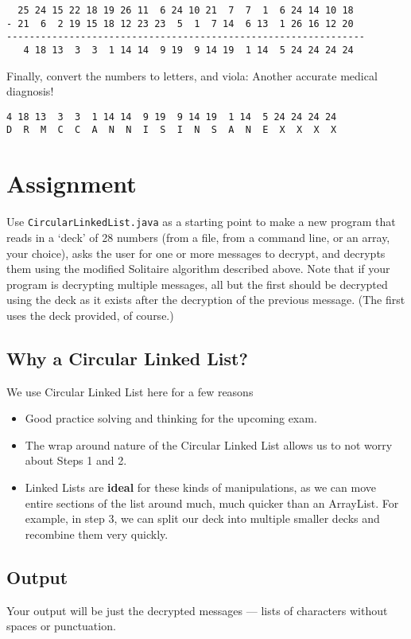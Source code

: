\documentclass[]{article}
\begin{document}
\begin{verbatim}
  25 24 15 22 18 19 26 11  6 24 10 21  7  7  1  6 24 14 10 18
- 21  6  2 19 15 18 12 23 23  5  1  7 14  6 13  1 26 16 12 20
---------------------------------------------------------------
   4 18 13  3  3  1 14 14  9 19  9 14 19  1 14  5 24 24 24 24
\end{verbatim}

Finally, convert the numbers to letters, and viola:  Another
accurate medical diagnosis!

\begin{verbatim}
4 18 13  3  3  1 14 14  9 19  9 14 19  1 14  5 24 24 24 24
D  R  M  C  C  A  N  N  I  S  I  N  S  A  N  E  X  X  X  X
\end{verbatim}


\newpage
\section{Assignment}  
Use \texttt{CircularLinkedList.java} as a starting point to make a new program  that reads in a `deck' of 28 numbers (from a file, from a command line, or an array, your choice), asks the user for 
one or more messages to decrypt, and decrypts
them using the modified Solitaire algorithm described above.  Note that
if your program is decrypting multiple messages, all but the first should be
decrypted using the deck as it exists after the decryption of the previous
message.  (The first uses the deck provided, of course.)


\subsection{Why a Circular Linked List?}
We use Circular Linked List here for a few reasons
\begin{itemize}
	\item Good practice solving and thinking for the upcoming exam.
	\item The wrap around nature of the Circular Linked List allows us to not worry about Steps 1 and 2.
	\item Linked Lists are \textbf{ideal} for these kinds of manipulations, as we can move entire sections of the list around much, much quicker than an ArrayList.
	For example, in step 3, we can split our deck into multiple smaller decks and recombine them very quickly.
\end{itemize}


\subsection{Output}
Your output will be just the decrypted messages --- lists of characters
without spaces or punctuation.
\end{document}
